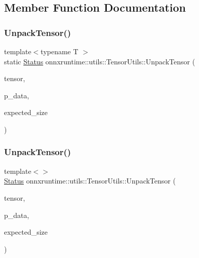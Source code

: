 \subsection{Member Function Documentation}
\mbox{\label{classonnxruntime_1_1utils_1_1TensorUtils_a2fb568cfbc282c4732a08059bea19a6f}} 
\subsubsection{\texorpdfstring{Unpack\+Tensor()}{UnpackTensor()}\hspace{0.1cm}{\footnotesize\ttfamily [1/4]}}
{\footnotesize\ttfamily template$<$typename T $>$ \\
static \mbox{\hyperlink{classonnxruntime_1_1common_1_1Status}{Status}} onnxruntime\+::utils\+::\+Tensor\+Utils\+::\+Unpack\+Tensor (\begin{DoxyParamCaption}\item[{const O\+N\+N\+X\+\_\+\+N\+A\+M\+E\+S\+P\+A\+C\+E\+::\+Tensor\+Proto \&}]{tensor,  }\item[{T $\ast$}]{p\+\_\+data,  }\item[{int64\+\_\+t}]{expected\+\_\+size }\end{DoxyParamCaption})\hspace{0.3cm}{\ttfamily [static]}}

\mbox{\label{classonnxruntime_1_1utils_1_1TensorUtils_a86c0b1961239a5198acd3955ddf83869}} 
\subsubsection{\texorpdfstring{Unpack\+Tensor()}{UnpackTensor()}\hspace{0.1cm}{\footnotesize\ttfamily [2/4]}}
{\footnotesize\ttfamily template$<$$>$ \\
\mbox{\hyperlink{classonnxruntime_1_1common_1_1Status}{Status}} onnxruntime\+::utils\+::\+Tensor\+Utils\+::\+Unpack\+Tensor (\begin{DoxyParamCaption}\item[{const O\+N\+N\+X\+\_\+\+N\+A\+M\+E\+S\+P\+A\+C\+E\+::\+Tensor\+Proto \&}]{tensor,  }\item[{std\+::string $\ast$}]{p\+\_\+data,  }\item[{int64\+\_\+t}]{expected\+\_\+size }\end{DoxyParamCaption})}

